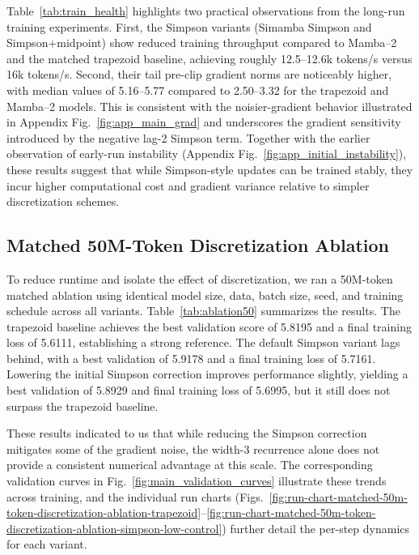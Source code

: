 \documentclass[conference]{IEEEtran}
\newcommand{\modelname}{Simamba\xspace}
\newcommand{\mambatwo}{Mamba--2\xspace}
\begin{document}
Table~\ref{tab:train_health} highlights two practical observations from the long-run training experiments. First, the Simpson variants (\modelname{} Simpson and Simpson+midpoint) show reduced training throughput compared to \mambatwo and the matched trapezoid baseline, achieving roughly 12.5–12.6k tokens/s versus 16k tokens/s. Second, their tail pre-clip gradient norms are noticeably higher, with median values of 5.16–5.77 compared to 2.50–3.32 for the trapezoid and \mambatwo models. This is consistent with the noisier-gradient behavior illustrated in Appendix Fig.~\ref{fig:app_main_grad} and underscores the gradient sensitivity introduced by the negative lag-2 Simpson term. Together with the earlier observation of early-run instability (Appendix Fig.~\ref{fig:app_initial_instability}), these results suggest that while Simpson-style updates can be trained stably, they incur higher computational cost and gradient variance relative to simpler discretization schemes.

\subsection{Matched 50M-Token Discretization Ablation}

To reduce runtime and isolate the effect of discretization, we ran a 50M-token matched ablation using identical model size, data, batch size, seed, and training schedule across all variants. Table~\ref{tab:ablation50} summarizes the results. The trapezoid baseline achieves the best validation score of 5.8195 and a final training loss of 5.6111, establishing a strong reference. The default Simpson variant lags behind, with a best validation of 5.9178 and a final training loss of 5.7161. Lowering the initial Simpson correction improves performance slightly, yielding a best validation of 5.8929 and final training loss of 5.6995, but it still does not surpass the trapezoid baseline.

These results indicated to us that while reducing the Simpson correction mitigates some of the gradient noise, the width-3 recurrence alone does not provide a consistent numerical advantage at this scale. The corresponding validation curves in Fig.~\ref{fig:main_validation_curves} illustrate these trends across training, and the individual run charts (Figs.~\ref{fig:run-chart-matched-50m-token-discretization-ablation-trapezoid}–\ref{fig:run-chart-matched-50m-token-discretization-ablation-simpson-low-control}) further detail the per-step dynamics for each variant.
\end{document}
